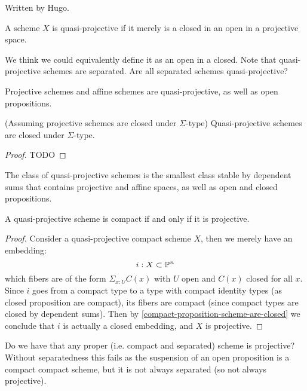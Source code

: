 Written by Hugo.

\begin{definition}
A scheme $X$ is quasi-projective if it merely is a closed in an open in a projective space. 
\end{definition}

We think we could equivalently define it as an open in a closed. Note that quasi-projective schemes are separated. Are all separated schemes quasi-projective?

\begin{lemma}
Projective schemes and affine schemes are quasi-projective, as well as open propositions.
\end{lemma}

\begin{lemma}
(Assuming projective schemes are closed under $\Sigma$-type) Quasi-projective schemes are closed under $\Sigma$-type.
\end{lemma}

\begin{proof}
TODO
\end{proof}

\begin{corollary}
The class of quasi-projective schemes is the smallest class stable by dependent sums that contains projective and affine spaces, as well as open and closed propositions.
\end{corollary}

\begin{proposition}
A quasi-projective scheme is compact if and only if it is projective.
\end{proposition}

\begin{proof}
Consider a quasi-projective compact scheme $X$, then we merely have an embedding:
\[i: X\subset \mathbb{P}^n\]
which fibers are of the form $\Sigma_{x:U}C(x)$ with $U$ open and $C(x)$ closed for all $x$. Since $i$ goes from a compact type to a type with compact identity types (as closed proposition are compact), its fibers are compact (since compact types are closed by dependent sums). Then by \cref{compact-proposition-scheme-are-closed} we conclude that $i$ is actually a closed embedding, and $X$ is projective.
\end{proof}

Do we have that any proper (i.e. compact and separated) scheme is projective? Without separatedness this fails as the suspension of an open proposition is a compact compact scheme, but it is not always separated (so not always projective). 
